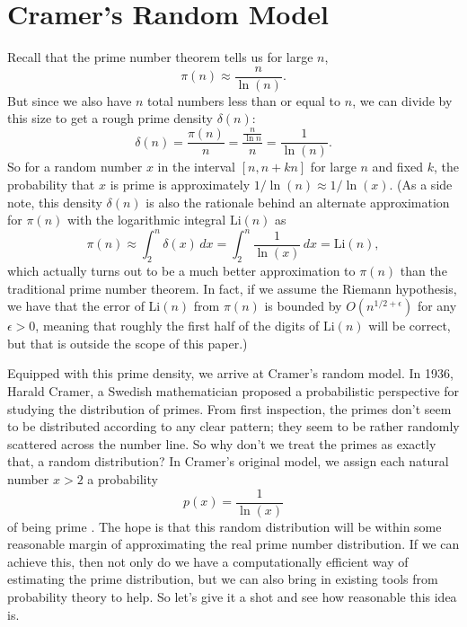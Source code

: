 \documentclass[conference]{IEEEtran}
\begin{document}
\section{Cramer's Random Model}
Recall that the prime number theorem tells us for
large $n$,
\[\pi(n) \approx \frac{n}{\ln(n)}.\]
But since we also have $n$ total numbers less than or equal to
$n$, we can divide by this size to get a rough prime density
$\delta(n)$:
\[\delta(n) = \frac{\pi(n)}{n} = \frac{\frac{n}{\ln{n}}}{n} = \frac{1}{\ln(n)}.\]
So for a random number $x$ in the interval $[n, n + kn]$ for
large $n$ and fixed $k$, the probability that $x$ is prime is
approximately $1 / \ln(n) \approx 1 / \ln(x)$. (As a side note, this
density $\delta(n)$ is also the rationale behind an alternate
approximation for $\pi(n)$ with the logarithmic integral
$\text{Li}(n)$ as
\[\pi(n) \approx \int_2^{n} \delta(x)\, dx = \int_2^{n} \frac{1}{\ln(x)}\, dx = \text{Li}(n),\]
which actually turns out to be a much better approximation to
$\pi(n)$ than the traditional prime number theorem. In
fact, if we assume the
Riemann hypothesis, we have that the error of $\text{Li}(n)$ from
$\pi(n)$ is bounded by $O(n^{1/2 + \epsilon})$ for any
$\epsilon > 0$, meaning that roughly the first half of the
digits of
$\text{Li}(n)$ will be correct,
but that is outside the scope of this paper.)

Equipped with this prime density, we arrive at
Cramer's random model. In 1936, Harald Cramer, a Swedish mathematician
proposed a probabilistic perspective for studying
the distribution of primes. From first inspection,
the primes don't seem to be distributed according to
any clear pattern; they seem to be rather randomly
scattered across the number line. So why don't
we treat the primes as exactly that, a random distribution?
In Cramer's original model, we assign each natural number
$x > 2$ a probability
\[p(x) = \frac{1}{\ln(x)}\]
of being prime \cite{b4}.
The hope is that this random distribution will be within
some reasonable margin of approximating the real prime
number distribution. If we can achieve this, then not only
do we have a computationally efficient way of
estimating the prime distribution, but we can also bring
in existing tools from probability theory to help. So
let's give it a shot and see how reasonable this idea is.
\end{document}
